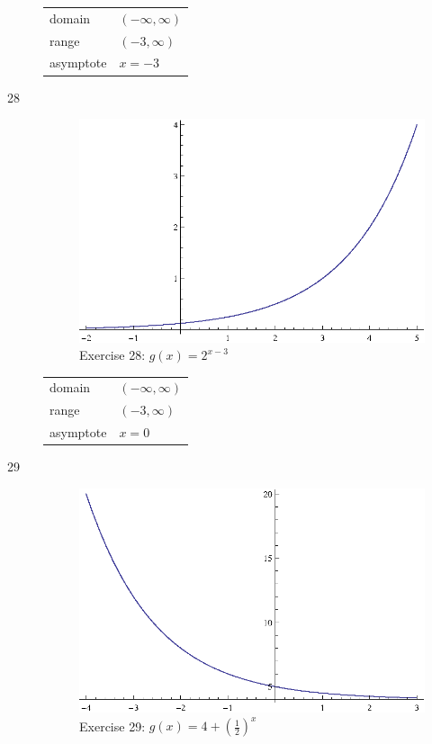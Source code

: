 \documentclass{exam}
\begin{document}
\begin{description}
      \begin{tabular}[H]{ll}
        \toprule
        domain    & $(-\infty, \infty)$ \\
        range     & $(-3, \infty)$ \\
        asymptote & $x = -3$ \\
        \bottomrule
      \end{tabular}

    \item[28] 
      \begin{figure}[H]
        \centering
        \includegraphics[scale=1.0]{exercise28.eps}
        \caption*{Exercise 28: $g(x) = 2^{x - 3}$}
      \end{figure}

      \begin{tabular}[H]{ll}
        \toprule
        domain    & $(-\infty, \infty)$ \\
        range     & $(-3, \infty)$ \\
        asymptote & $x = 0$ \\
        \bottomrule
      \end{tabular}

    \item[29] 
      \begin{figure}[H]
        \centering
        \includegraphics[scale=1.0]{exercise29.eps}
        \caption*{Exercise 29: $g(x) = 4 + \left( \frac{1}{2} \right)^x$}
      \end{figure}


\end{description}
\end{document}

